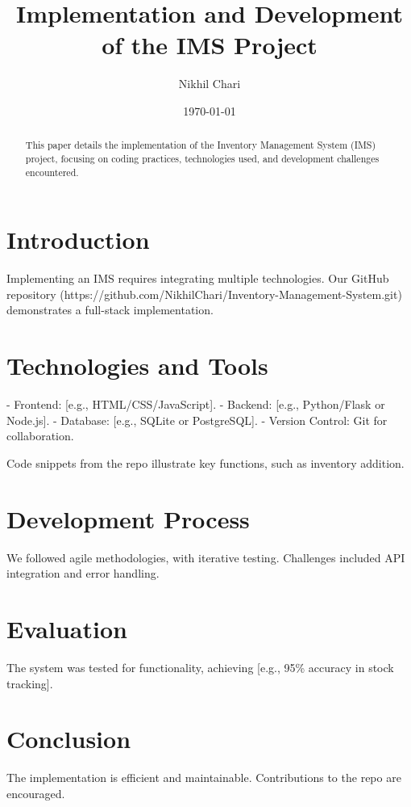 \documentclass{article}
\title{Implementation and Development of the IMS Project}
\author{Nikhil Chari}
\date{\today}
\begin{document}
\maketitle

\begin{abstract}
This paper details the implementation of the Inventory Management System (IMS) project, focusing on coding practices, technologies used, and development challenges encountered.
\end{abstract}

\section{Introduction}
Implementing an IMS requires integrating multiple technologies. Our GitHub repository (https://github.com/NikhilChari/Inventory-Management-System.git) demonstrates a full-stack implementation.

\section{Technologies and Tools}
- Frontend: [e.g., HTML/CSS/JavaScript].
- Backend: [e.g., Python/Flask or Node.js].
- Database: [e.g., SQLite or PostgreSQL].
- Version Control: Git for collaboration.

Code snippets from the repo illustrate key functions, such as inventory addition.

\section{Development Process}
We followed agile methodologies, with iterative testing. Challenges included API integration and error handling.

\section{Evaluation}
The system was tested for functionality, achieving [e.g., 95\% accuracy in stock tracking].

\section{Conclusion}
The implementation is efficient and maintainable. Contributions to the repo are encouraged.


\end{document}
